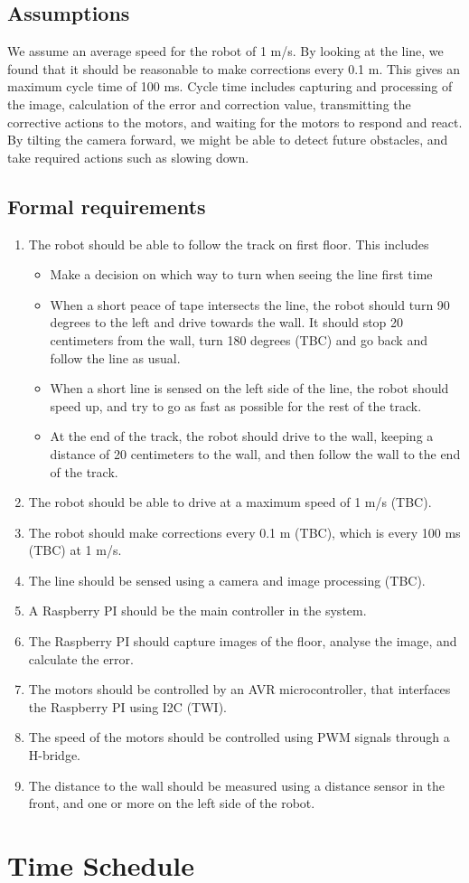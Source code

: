 \subsection{Assumptions}

We assume an average speed for the robot of 1 m/s. By looking at the line, we found that it should be
reasonable to make corrections every 0.1 m. This gives an maximum cycle time of 100 ms. Cycle
time includes capturing and processing of the image, calculation of the error and correction value,
transmitting the corrective actions to the motors, and waiting for the motors to respond and react.
By tilting the camera forward, we might be able to detect future obstacles, and take required actions
such as slowing down.

\subsection{Formal requirements}
\begin{enumerate}
\item The robot should be able to follow the track on first floor. This includes 
\begin{itemize}
\item Make a decision on which way to turn when seeing the line first time
\item When a short peace of tape intersects the line, the robot should turn 90 degrees to the left
and drive towards the wall. It should stop 20 centimeters from the wall, turn 180 degrees
(TBC) and go back and follow the line as usual.
\item When a short line is sensed on the left side of the line, the robot should speed up, and try to go as fast as possible for the rest of the track.
\item At the end of the track, the robot should drive to the wall, keeping a distance of 20
centimeters to the wall, and then follow the wall to the end of the track.
\end{itemize}
\item The robot should be able to drive at a maximum speed of 1 m/s (TBC).
\item The robot should make corrections every 0.1 m (TBC), which is every 100 ms (TBC) at 1 m/s.
\item The line should be sensed using a camera and image processing (TBC).
\item A Raspberry PI should be the main controller in the system.
\item The Raspberry PI should capture images of the floor, analyse the image, and calculate the error.
\item The motors should be controlled by an AVR microcontroller, that interfaces the Raspberry PI
using I2C (TWI).
\item The speed of the motors should be controlled using PWM signals through a H-bridge.
\item The distance to the wall should be measured using a distance sensor in the front, and one or more on the
left side of the robot.
\end{enumerate}



\section{Time Schedule}

